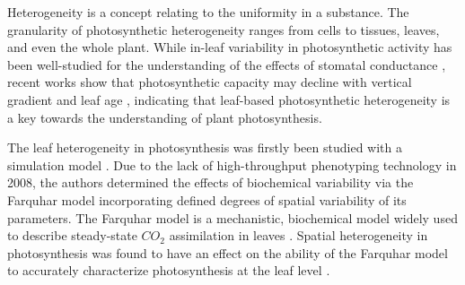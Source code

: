 \documentclass[times,11pt]{article}
\begin{document}



Heterogeneity is a concept relating to the uniformity in a substance.  %
%
The granularity of photosynthetic heterogeneity ranges from cells to tissues, leaves, and even the whole plant. While in-leaf variability in photosynthetic activity has been well-studied for the understanding of the effects of stomatal conductance \cite{Buckley1997,Cheeseman1991}, recent works show that photosynthetic capacity may decline with vertical gradient and leaf age \cite{chen2008effect,Kitajima2002}, indicating that leaf-based photosynthetic heterogeneity is a key towards the understanding of plant photosynthesis.

The leaf heterogeneity in photosynthesis was firstly been studied  with a simulation model \cite{chen2008effect}. Due to the lack of high-throughput phenotyping technology in 2008, the authors determined the effects of biochemical variability via the Farquhar model incorporating defined degrees of spatial variability of its parameters. The Farquhar model is a mechanistic, biochemical model widely used to describe steady-state $CO_2$ assimilation in leaves \cite{farquhar2001models,sharkey1985o2}. Spatial heterogeneity in photosynthesis was found to have an effect on the ability of the Farquhar model to accurately characterize photosynthesis at the leaf level \cite{chen2008effect}. 
\end{document}
